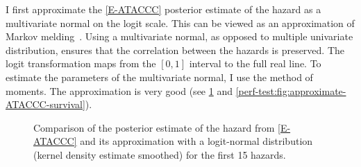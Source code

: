 \documentclass[thesis.tex]{subfiles}
\begin{document}
I first approximate the \cref{E-ATACCC} posterior estimate of the hazard as a multivariate normal on the logit scale.
This can be viewed as an approximation of Markov melding~\autocite{goudieJoining}.
Using a multivariate normal, as opposed to multiple univariate distribution, ensures that the correlation between the hazards is preserved.
The logit transformation maps from the $[0, 1]$ interval to the full real line.
To estimate the parameters of the multivariate normal, I use the method of moments.
The approximation is very good (see \cref{perf-test:fig:approximate-ATACCC-hazard} and \cref{perf-test:fig:approximate-ATACCC-survival}).
\begin{figure}
  \vspace{-2.5cm}
  \caption[Approximating the ATACCC posterior hazard as a logit-normal]{Comparison of the posterior estimate of the hazard from \cref{E-ATACCC} and its approximation with a logit-normal distribution (kernel density estimate smoothed) for the first 15 hazards. \label{perf-test:fig:approximate-ATACCC-hazard}}
\end{figure}
\end{document}
